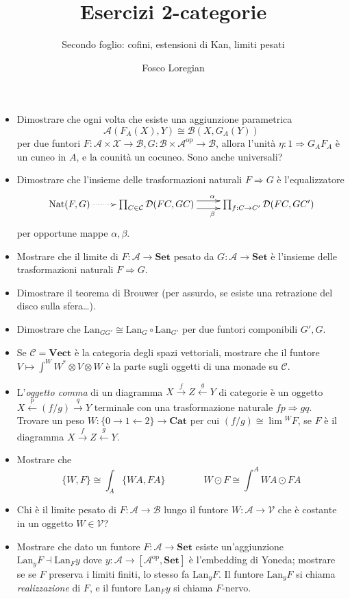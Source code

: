 \documentclass{amsart}
\title{Esercizi 2-categorie}
\subtitle{Secondo foglio: cofini, estensioni di Kan, limiti pesati}
\author{Fosco Loregian}
\def\Lan{\text{Lan}}
\begin{document}
\maketitle
\begin{itemize}
\item Dimostrare che ogni volta che esiste una aggiunzione parametrica
\[
\mathcal A(F_A(X),Y)\cong \mathcal B(X, G_A(Y))
\]
per due funtori $F : \mathcal A\times\mathcal X\to\mathcal B,G : \mathcal B\times\mathcal A^\text{op}\to\mathcal B$, allora l'unità $\eta : 1 \Rightarrow G_AF_A$ è un cuneo in $A$, e la counità un cocuneo. Sono anche universali?
\item Dimostrare che l'insieme delle trasformazioni naturali $F\Rightarrow G$ è l'equalizzatore
\[
\xymatrix{
\text{Nat}(F,G) \ar@{.>}[r]& \prod_{C\in\mathcal C} \mathcal D(FC,GC) \ar@<4pt>[r]^\alpha\ar@<-4pt>[r]_\beta & \prod_{f : C\to C'} \mathcal D(FC,GC') 
}
\]
per opportune mappe $\alpha,\beta$.
\item Mostrare che il limite di $F : \mathcal A \to \mathbf{Set}$ pesato da $G : \mathcal A \to \mathbf{Set}$ è l'insieme delle trasformazioni naturali $F\Rightarrow G$.
\item Dimostrare il teorema di Brouwer (per assurdo, se esiste una retrazione del disco sulla sfera\dots).
\item Dimostrare che $\Lan_{GG'}\cong \Lan_G\circ\Lan_{G'}$ per due funtori componibili $G',G$.
\item Se $\mathcal C = \mathbf{Vect}$ è la categoria degli spazi vettoriali, mostrare che il funtore $V\mapsto \int^W W^* \otimes V \otimes W$ è la parte sugli oggetti di una monade su $\mathcal C$.
\item L'\emph{oggetto comma} di un diagramma $X \xrightarrow{f}Z\xleftarrow{g}Y$ di categorie è un oggetto $X \xleftarrow{p}(f/g)\xrightarrow{q}Y$ terminale con una trasformazione naturale $fp\Rightarrow gq$. Trovare un peso $W : \{0\to 1\leftarrow 2\} \to \mathbf{Cat}$ per cui $(f/g)\cong \lim{}^WF$, se $F$ è il diagramma $X \xrightarrow{f}Z\xleftarrow{g}Y$.
\item Mostrare che
\[\{W,F\} \cong \int_A \{WA,FA\} \qquad\qquad W\odot F \cong \int^A WA \odot FA\]
\item Chi è il limite pesato di $F : \mathcal A \to \mathcal B$ lungo il funtore $W : \mathcal A\to \mathcal V$ che è costante in un oggetto $W\in\mathcal V$?
\item Mostrare che dato un funtore $F : \mathcal A\to \mathbf{Set}$ esiste un'aggiunzione $\Lan_yF\dashv\Lan_Fy$ dove $y : \mathcal A \to [\mathcal A^\text{op},\mathbf{Set}]$ è l'embedding di Yoneda; mostrare se se $F$ preserva i limiti finiti, lo stesso fa $\Lan_yF$. Il funtore $\Lan_yF$ si chiama \emph{realizzazione} di $F$, e il funtore $\Lan_Fy$ si chiama $F$-nervo.

\end{itemize}
\end{document}
